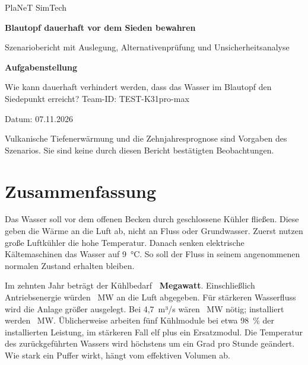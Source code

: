 



\begin{titlepage}
  \centering
  \vspace*{24mm}
  {\fontsize{16}{20}\selectfont PlaNeT SimTech\par}
  \vspace{14mm}
  {\fontsize{22}{27}\selectfont\bfseries Blautopf dauerhaft vor dem Sieden bewahren\par}
  \vspace{8mm}
  {\fontsize{14}{18}\selectfont Szenariobericht mit Auslegung, Alternativenprüfung und Unsicherheitsanalyse\par}
  \vspace{18mm}
  {\fontsize{12}{15}\selectfont\bfseries Aufgabenstellung\par}
  \vspace{3mm}
  Wie kann dauerhaft verhindert werden, dass das Wasser im Blautopf den Siedepunkt erreicht?
  \vfill
  Team-ID: TEST-K31pro-max\par
  \vspace{3mm}
  Datum: 07.11.2026\par
  \vspace{10mm}
  Vulkanische Tiefenerwärmung und die Zehnjahresprognose sind Vorgaben des Szenarios. Sie sind keine durch diesen Bericht bestätigten Beobachtungen.
  \vspace{8mm}
\end{titlepage}

\setcounter{page}{1}
\section*{Zusammenfassung}

Das Wasser soll vor dem offenen Becken durch geschlossene Kühler fließen. Diese geben die Wärme an die Luft ab, nicht an Fluss oder Grundwasser. Zuerst nutzen große Luftkühler die hohe Temperatur. Danach senken elektrische Kältemaschinen das Wasser auf 9~°C. So soll der Fluss in seinem angenommenen normalen Zustand erhalten bleiben.

Im zehnten Jahr beträgt der Kühlbedarf \textbf{\QFinal~Megawatt}. Einschließlich Antriebsenergie würden \QAirRejection~MW an die Luft abgegeben. Für stärkeren Wasserfluss wird die Anlage größer ausgelegt. Bei 4,7~m³/s wären \DesignCooling~MW nötig; installiert werden \QReserve~MW. Üblicherweise arbeiten fünf Kühlmodule bei etwa 98~\% der installierten Leistung, im stärkeren Fall elf plus ein Ersatzmodul. Die Temperatur des zurückgeführten Wassers wird höchstens um ein Grad pro Stunde geändert. Wie stark ein Puffer wirkt, hängt vom effektiven Volumen ab.

